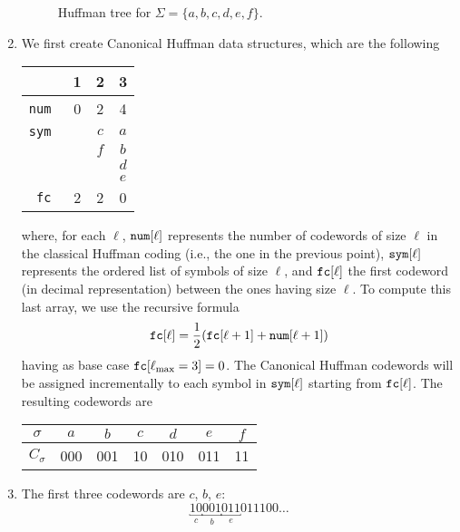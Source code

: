 \begin{enumerate}
\begin{figure}[t]
    \caption{Huffman tree for $\Sigma = \{ a, b, c, d, e, f \}$.}

    \label{fig:huffman-tree}
  \end{figure}

  \item We first create Canonical Huffman data structures, which are the
  following
  \begin{center}
    \begin{tabular}{|r||c|c|c|}
      \multicolumn{1}{r}{} & \multicolumn{1}{c}{\tiny 1} & \multicolumn{1}{c}{\tiny 2} & \multicolumn{1}{c}{\tiny 3} \\ \hline
      \tt num & 0 & 2 & 4 \\ \hline
      \tt sym &   & $c$ & $a$ \\
              & & $f$ & $b$ \\
              & & & $d$ \\
              & & & $e$ \\ \hline
      \tt fc  & 2 & 2 & 0 \\ \hline
    \end{tabular}
  \end{center}
  where, for each $\ell$, $\text{\tt num}[\ell]$ represents the number of
  codewords of size $\ell$ in the classical Huffman coding (i.e., the one in the
  previous point), $\text{\tt sym}[\ell]$ represents the ordered list of symbols
  of size $\ell$, and $\text{\tt fc}[\ell]$ the first codeword (in decimal
  representation) between the ones having size $\ell$. To compute this last
  array, we use the recursive formula $$\text{\tt fc}[\ell] =
  \frac{1}{2}(\text{\tt fc}[\ell + 1] + \text{\tt num}[\ell + 1])$$ having as
  base case $\text{\tt fc}[\ell_\text{max} = 3] = 0$. The Canonical Huffman
  codewords will be assigned incrementally to each symbol in $\text{\tt
  sym}[\ell]$ starting from $\text{\tt fc}[\ell]$. The resulting codewords are
  \begin{center}
    \begin{tabular}{c||c|c|c|c|c|c}
    $\sigma$ &  $a$ & $b$ & $c$ & $d$ & $e$ & $f$ \\\hline
    $C_\sigma$ &  000 & 001 & 10 & 010 & 011 & 11 \\
    \end{tabular}
  \end{center}

  \item The first three codewords are $c$, $b$, $e$:
  $$\underbracket{10}_c\underbracket{001}_b\underbracket{011}_e011100\dots$$

\end{enumerate}
